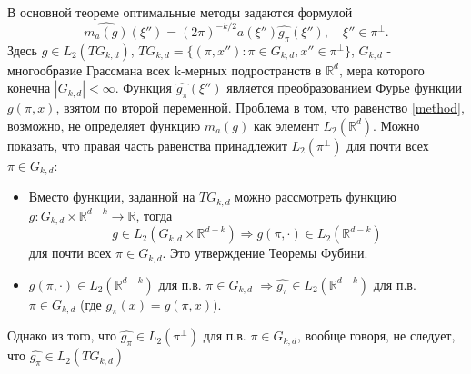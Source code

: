 \documentclass{article}
\begin{document}
В основной теореме оптимальные методы задаются формулой 
\begin{equation}
\label{method}
\hat{m_a(g)}(\xi'')=(2\pi)^{-k/2}a(\xi'')\hat{g_\pi}(\xi''),\quad \xi''\in\pi^\perp.
\end{equation}
Здесь $g\in L_2(TG_{k,d})$, $TG_{k,d}=\{(\pi,x''):\pi\in G_{k,d}, x''\in\pi^\perp\}$, $G_{k,d}$ - многообразие Грассмана всех k-мерных подространств в $\mathbb R^d$, мера которого конечна $|G_{k,d}|<\infty$. Функция $\hat{g_\pi}(\xi'')$ является преобразованием Фурье функции $g(\pi,x)$, взятом по второй переменной. Проблема в том, что равенство \eqref{method}, возможно, не определяет функцию $m_a(g)$ как элемент $L_2(\mathbb R^d)$. Можно показать, что правая часть равенства принадлежит $L_2(\pi^\perp)$ для почти всех $\pi\in G_{k,d}$:

\begin{itemize}
    \item Вместо функции, заданной на $TG_{k,d}$ можно рассмотреть функцию $g:G_{k,d}\times\mathbb R^{d-k}\longrightarrow\mathbb R$, тогда
		$$g\in L_2(G_{k,d}\times \mathbb R^{d-k})\Rightarrow g(\pi,\cdot)\in L_2(\mathbb R^{d-k})$$ для почти всех $\pi\in G_{k,d}$. Это утверждение Теоремы Фубини.
    \item $g(\pi,\cdot)\in L_2(\mathbb R^{d-k})$ для п.в. $\pi\in G_{k,d}$ $\Rightarrow \hat {g_\pi}\in L_2(\mathbb R^{d-k})$ для п.в. $\pi\in G_{k,d}$ (где $g_\pi(x)=g(\pi,x)$).
\end{itemize}

Однако из того, что $\hat {g_\pi}\in L_2(\pi^\perp)$ для п.в. $\pi\in G_{k,d}$, вообще говоря, не следует, что $\hat {g_\pi}\in L_2(TG_{k,d})$
\end{document}
